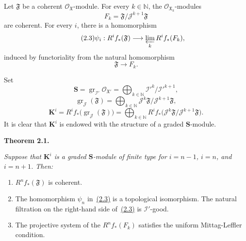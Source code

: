 Let $\mathfrak F$ be a coherent $\mathcal O_{\mathfrak X}$-module. For every
$k\in\mathbb N$, the $\mathcal O_{\mathfrak X_k}$-modules
\begin{equation}
\tag{2.2}\label{eq:IX.2.2}
F_k=\mathfrak F/\mathcal J^{k+1}\mathfrak F
\end{equation}
are coherent. For every $i$, there is a homomorphism
\begin{equation}
\tag{2.3}\label{eq:IX.2.3}
\psi_i:R^i f_*(\mathfrak F)
  \longrightarrow\varprojlim_k R^i f_*(F_k),
\end{equation}
induced by functoriality from the natural homomorphism
\begin{equation}
\tag{2.4}\label{eq:IX.2.4}
\mathfrak F\longrightarrow F_k.
\end{equation}

Set
\begin{equation}
\tag{2.5}\label{eq:IX.2.5}
\mathbf S
  =\operatorname{gr}_{\mathcal I'}\mathcal O_{\mathfrak X'}
  =\bigoplus_{k\in\mathbb N}\mathcal I'^{k}/\mathcal I'^{k+1},
\end{equation}
\begin{equation}
\tag{2.6}\label{eq:IX.2.6}
\operatorname{gr}_{\mathcal J}(\mathfrak F)
  =\bigoplus_{k\in\mathbb N}
    \mathcal J^{k}\mathfrak F/\mathcal J^{k+1}\mathfrak F,
\end{equation}
\begin{equation}
\tag{2.7}\label{eq:IX.2.7}
\mathbf K^{i}
  =R^{i}f_*\bigl(\operatorname{gr}_{\mathcal J}(\mathfrak F)\bigr)
  =\bigoplus_{k\in\mathbb N}
    R^{i}f_*\bigl(\mathcal J^{k}\mathfrak F/
      \mathcal J^{k+1}\mathfrak F\bigr).
\end{equation}
It is clear that $\mathbf K^{i}$ is endowed with the structure of a graded
$\mathbf S$-module.

\medskip
\noindent\textbf{Theorem 2.1.}\quad
{\itshape Suppose that $\mathbf K^i$ is a graded $\mathbf S$-module of finite
type for $i=n-1$, $i=n$, and $i=n+1$. Then:
\begin{enumerate}
\renewcommand{\labelenumi}{(\roman{enumi})}
\setlength{\itemsep}{0.35em}
\item $R^n f_*(\mathfrak F)$ is coherent.
\item The homomorphism $\psi_n$ in~\hyperref[eq:IX.2.3]{(2.3)} is a topological isomorphism. The
natural filtration on the right-hand side of~\hyperref[eq:IX.2.3]{(2.3)} is $\mathcal I'$-good.
\item The projective system of the $R^n f_*(F_k)$ satisfies the uniform
Mittag-Leffler condition.
\end{enumerate}}

